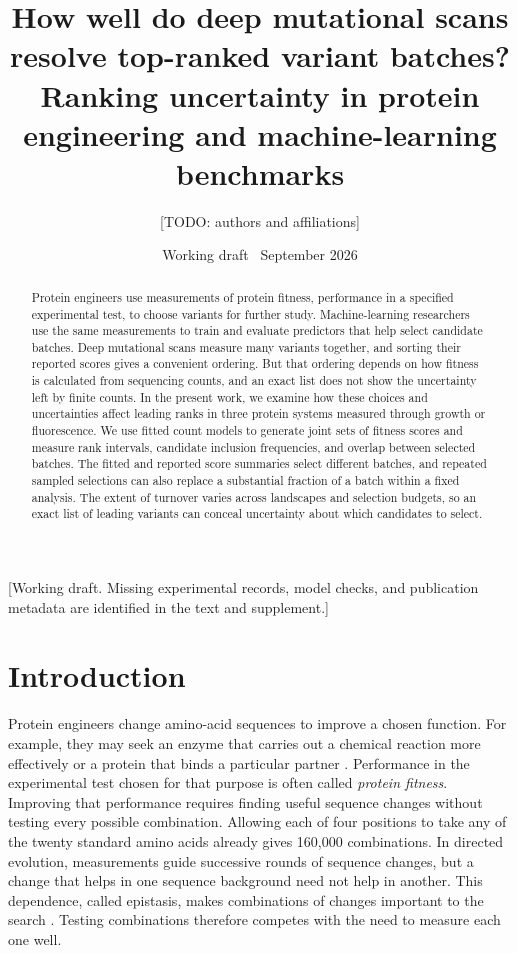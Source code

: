 \documentclass[11pt]{article}
\title{How well do deep mutational scans resolve top-ranked variant batches?\\
\large Ranking uncertainty in protein engineering and machine-learning benchmarks}
\author{[TODO: authors and affiliations]}
\date{Working draft \textbar\ September 2026}
\newcommand{\note}[1]{\textcolor{boxrule}{\small[#1]}}
\begin{document}
\maketitle

\noindent\note{Working draft. Missing experimental records, model checks,
and publication metadata are identified in the text and supplement.}

\begin{abstract}
Protein engineers use measurements of protein fitness, performance in a
specified experimental test, to choose variants for further study.
Machine-learning researchers use the same measurements to train and evaluate
predictors that help select candidate batches.
Deep mutational scans measure many variants together, and sorting their
reported scores gives a convenient ordering.
But that ordering depends on how fitness is calculated from sequencing
counts, and an exact list does not show the uncertainty left by finite counts.
In the present work, we examine how these choices and uncertainties affect
leading ranks in three protein systems measured through growth or fluorescence.
We use fitted count models to generate joint sets of fitness scores and
measure rank intervals, candidate inclusion frequencies, and overlap between
selected batches.
The fitted and reported score summaries select different batches, and
repeated sampled selections can also replace a substantial fraction of a
batch within a fixed analysis.
The extent of turnover varies across landscapes and selection budgets,
so an exact list of leading variants can conceal uncertainty
about which candidates to select.
\end{abstract}

\section{Introduction}
\label{sec:introduction}

Protein engineers change amino-acid sequences to improve a chosen function.
For example, they may seek an enzyme that carries out a chemical reaction
more effectively or a protein that binds a particular partner
\citep{yang2019}. Performance in the experimental test chosen for that
purpose is often called \emph{protein fitness}. Improving that performance
requires finding useful sequence changes without testing every possible
combination. Allowing each of four positions to take any of the twenty
standard amino acids already gives 160,000 combinations. In directed
evolution, measurements guide successive rounds of sequence changes,
but a change that helps in one sequence background need not help in
another. This dependence, called epistasis, makes combinations of changes
important to the search \citep{yang2019,johnston2024}. Testing combinations
therefore competes with the need to measure each one well.
\end{document}
